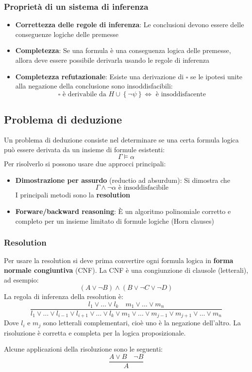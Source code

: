 \documentclass[a4paper]{article}
\begin{document}
\subsubsection{Proprietà di un sistema di inferenza}
\begin{itemize}
  \item \textbf{Correttezza delle regole di inferenza}: Le conclusioni devono essere
    delle conseguenze logiche delle premesse
  \item \textbf{Completezza}: Se una formula è una conseguenza logica delle premesse,
    allora deve essere possibile derivarla usando le regole di inferenza
  \item \textbf{Completezza refutazionale}: Esiste una derivazione di \( \square \) se
    le ipotesi unite alla negazione della conclusione sono insoddisfacibili:
    \[
      \square \text{ è derivabile da } H \cup \left\{ \neg \psi \right\} \iff
      \text{ è insoddisfacente}
    \] 
\end{itemize}

\subsection{Problema di deduzione}
Un problema di deduzione consiste nel determinare se una certa formula logica
può essere derivata da un insieme di formule esistenti:
\[
  \Gamma \models \alpha
\] 
Per risolverlo si possono usare due approcci principali:
\begin{itemize}
  \item \textbf{Dimostrazione per assurdo} (reductio ad absurdum): Si dimostra che
    \[
      \Gamma \wedge \neg \alpha \text{ è insoddisfacibile}
    \] 
    I principali metodi sono la \textbf{resolution}
  \item \textbf{Forware/backward reasoning}: È un algoritmo polinomiale corretto e
    completo per un insieme limitato di formule logiche (Horn clauses)
\end{itemize}

\subsubsection{Resolution}
Per usare la resolution si deve prima convertire ogni formula logica in \textbf{forma
normale congiuntiva} (CNF). La CNF è una congiunzione di clausole (letterali), ad esempio:
\[
  \left( A \vee \neg B \right) \wedge \left( B \vee \neg C \vee \neg D \right) 
\] 
La regola di inferenza della resolution è:
\[
\frac{l_1 \vee \ldots \vee l_k \quad m_1 \vee \ldots \vee m_n}
{
  l_1 \vee \ldots \vee l_{i-1} \vee l_{i+1} \vee \ldots \vee
  l_k \vee m_1 \vee \ldots \vee m_{j-1} \vee m_{j+1} \vee \ldots \vee m_n
}
\] 
Dove \( l_i \) e \( m_j \) sono letterali complementari, cioè uno è la negazione
dell'altro. La risoluzione è corretta e completa per la logica proposizionale.
\begin{example}
  Alcune applicazioni della risoluzione sono le seguenti:
  \[
    \frac{A \vee B \quad \neg B}{A}
  \]
\end{example}
\end{document}
